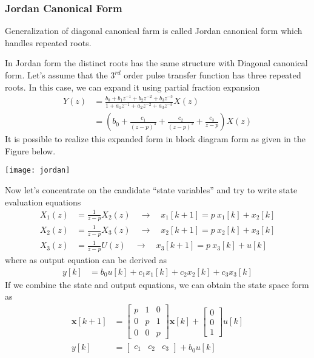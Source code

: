 \documentclass[twoside]{article}
\begin{document}
\subsubsection*{Jordan Canonical Form}

Generalization of diagonal canonical
farm is called Jordan canonical form
which handles repeated roots.

In Jordan form the distinct roots has the 
same structure with Diagonal canonical
form. Let's assume that the $3^{rd}$
order pulse transfer function has
three repeated roots. In this case,
we can expand it using partial fraction 
expansion 
%
\begin{align*}
Y(z) &= \frac{b_0 + b_1 z^{-1} + b_2 z^{-2} + b_3 z^{-3}}{1+ a_1
       z^{-1} + a_2 z^{-2} + a_3 z^{-3}} X(z)
\\
&= \left( b_0 + \frac{c_1}{(z - p)^3} + \frac{c_2}{(z - p)^2}
+ \frac{c_3}{z - p} \right) X(z)
\end{align*}
%
It is possible to realize this expanded form in block diagram 
form as given in the Figure below.
%
     \begin{center}
 \begin{minipage}[h]{0.5\linewidth}
     \begin{center}
       \texttt{[image: jordan]}
     \end{center}
 \end{minipage}
     \end{center}
%
Now let's concentrate on the candidate ``state variables''
and try to write state evaluation equations
%
\begin{align*}
X_1(z) &= \frac{1}{z - p} X_2(z) \quad \rightarrow \quad x_1[k+1] = p \
  x_1[k] + x_2[k]
\\
X_2(z) &= \frac{1}{z - p} X_3(z) \quad \rightarrow \quad x_2[k+1] = p
         \ x_2[k] +
  x_3[k]
\\
X_3(z) &= \frac{1}{z - p} U(z) \quad \rightarrow \quad x_3[k+1] = p \
  x_3[k] + u[k]
\end{align*}
%
where as output equation can be derived as
%
\begin{align*}
y[k] &= b_0 u[k] + c_1 x_1[k] + c_2 x_2[k] + c_3 x_3[k]
\end{align*}
%
If we combine the state and output equations, we
can obtain the state space form as
%
\begin{align*}
  \mathbf{x}[k+1] &= \left[ \begin{array}{ccc} p & 1 & 0\\ 0 & p & 1
    \\ 0 & 0 & p \end{array} \right] \mathbf{x}[k]
   + 
  \left[ \begin{array}{c} 0 \\ 0
    \\ 1 \end{array} \right] u[k]
\\
y[k] &= \left[ \begin{array}{ccc} c_1 & c_2 & c_3 \end{array} \right]
+ b_0 u[k]
\end{align*}
\end{document}
